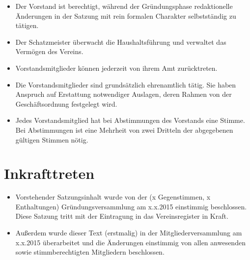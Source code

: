 \documentclass[a4paper,10pt]{article}
\begin{document}
\begin{itemize}
   \item Der Vorstand ist berechtigt, während der Gründungsphase redaktionelle Änderungen in der Satzung mit rein formalen Charakter selbstständig zu tätigen. 
   \item Der Schatzmeister überwacht die Haushaltsführung und verwaltet das Vermögen des Vereins.
   \item Vorstandsmitglieder können jederzeit von ihrem Amt zurücktreten.
   \item Die Vorstandsmitglieder sind grundsätzlich ehrenamtlich tätig. Sie haben Anspruch auf Erstattung notwendiger Auslagen, deren Rahmen von der Geschäftsordnung festgelegt wird.
   \item Jedes Vorstandsmitglied hat bei Abstimmungen des Vorstands eine Stimme. Bei Abstimmungen ist eine Mehrheit von zwei Dritteln der abgegebenen gültigen Stimmen nötig.
  \end{itemize}

\section{Inkrafttreten}
  \begin{itemize}
   \item Vorstehender Satzungsinhalt wurde von der (x Gegenstimmen, x Enthaltungen) Gründungsversammlung am x.x.2015 einstimmig beschlossen. Diese Satzung tritt mit der Eintragung in das Vereinsregister in Kraft. 
   \item Außerdem wurde dieser Text (erstmalig) in der Mitgliederversammlung am x.x.2015 überarbeitet und die Änderungen einstimmig von allen anwesenden sowie stimmberechtigten Mitgliedern beschlossen. 
  \end{itemize}

  
\end{document}
